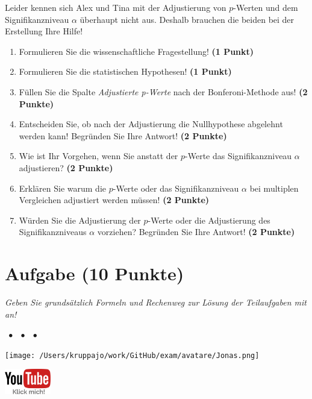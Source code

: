 \documentclass[a4paper, 9pt]{scrartcl}\usepackage[]{graphicx}\usepackage[]{xcolor}
\begin{document}
Leider kennen sich Alex und Tina mit der Adjustierung von $p$-Werten und dem Signifikanzniveau $\alpha$ überhaupt nicht aus. Deshalb brauchen die beiden bei der Erstellung Ihre Hilfe!

\begin{enumerate}
  \item Formulieren Sie die wissenschaftliche Fragestellung! \textbf{(1 Punkt)}
  \item Formulieren Sie die statistischen Hypothesen! \textbf{(1 Punkt)}
\item Füllen Sie die Spalte \textit{Adjustierte p-Werte} nach der Bonferoni-Methode aus! \textbf{(2 Punkte)}
\item Entscheiden Sie, ob nach der Adjustierung die Nullhypothese abgelehnt werden kann! Begründen Sie Ihre Antwort! \textbf{(2 Punkte)}
\item Wie ist Ihr Vorgehen, wenn Sie anstatt der $p$-Werte das Signifikanzniveau $\alpha$ adjustieren? \textbf{(2 Punkte)}
\item Erklären Sie warum die $p$-Werte oder das Signifikanzniveau $\alpha$ bei multiplen Vergleichen adjustiert werden müssen! \textbf{(2 Punkte)}
\item Würden Sie die Adjustierung der $p$-Werte oder die Adjustierung des Signifikanzniveaus $\alpha$ vorziehen? Begründen Sie Ihre Antwort! \textbf{(2 Punkte)}
\end{enumerate}


 
\clearpage

\section{Aufgabe \hfill (10 Punkte)}

\textit{Geben Sie grundsätzlich Formeln und Rechenweg zur Lösung der Teilaufgaben mit an!} \\[1Ex]
 

 
\ifcollection
\begin{flushright}
\tiny\vspace{-3Ex}
\textbf{\examinhaltstart}
\exammodulestat $\;\bullet$
\exammodulestatbbv $\;\bullet$
\exammodulestatversuch $\;\bullet$
\exammodulebiostat
\vspace{-4Ex}
\end{flushright}
\begin{minipage}[t]{0.5\textwidth}
\texttt{[image: /Users/kruppajo/work/GitHub/exam/avatare/Jonas.png]}
\end{minipage}
\begin{minipage}[t]{0.5\textwidth}
\hfill
\href{https://youtu.be/xq29O8qDrg0}{\includegraphics[width = 2cm]{img/youtube}}
\end{minipage}
\vspace{-3ex}
\fi
\end{document}
